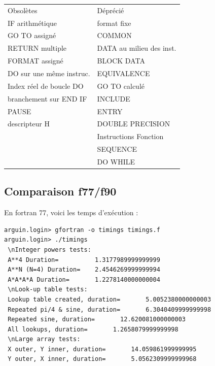 \documentclass[a4paper,twoside]{article}
\begin{document}
\begin{center}
\begin{tabular}{ll}
Obsolètes & Déprécié\\
IF arithmétique & format fixe\\
GO TO assigné & COMMON\\
RETURN multiple & DATA au milieu des inst.\\
FORMAT assigné & BLOCK DATA\\
DO sur une même instruc. & EQUIVALENCE\\
Index réel de boucle DO & GO TO calculé\\
branchement sur END IF & INCLUDE\\
PAUSE & ENTRY\\
descripteur H & DOUBLE PRECISION\\
 & Instructions Fonction\\
 & SEQUENCE\\
 & DO WHILE
\end{tabular}
\end{center}

\subsection{Comparaison f77/f90}
En fortran 77, voici les temps d'exécution : 
\begin{verbatim}
arguin.login> gfortran -o timings timings.f
arguin.login> ./timings 
 \nInteger powers tests:
 A**4 Duration=          1.3177989999999999     
 A**N (N=4) Duration=    2.4546269999999994     
 A*A*A*A Duration=       1.2278140000000004     
 \nLook-up table tests:
 Lookup table created, duration=       5.0052380000000003     
 Repeated pi/4 & sine, duration=       6.3040409999999998     
 Repeated sine, duration=       12.620081000000003     
 All lookups, duration=       1.2658079999999998     
 \nLarge array tests:
 X outer, Y inner, duration=       14.059861999999995     
 Y outer, X inner, duration=       5.0562309999999968   
\end{verbatim}
\end{document}
